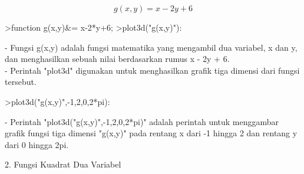 \documentclass[a4paper,10pt]{article}
\begin{document}
\begin{eulernotebook}
\begin{eulercomment}
\begin{eulercomment}
\begin{eulercomment}
\begin{eulercomment}
\begin{eulercomment}
\begin{eulercomment}
\begin{eulercomment}
\begin{eulercomment}
\begin{eulercomment}
\end{eulercomment}
\begin{eulerformula}
\[
g(x,y)=x-2y+6
\]
\end{eulerformula}
\begin{eulercomment}
\end{eulercomment}
\begin{eulerprompt}
>function g(x,y)&= x-2*y+6;
>plot3d("g(x,y)"):
\end{eulerprompt}
\begin{eulercomment}
- Fungsi g(x,y) adalah fungsi matematika yang mengambil dua variabel,
x dan y, dan menghasilkan sebuah nilai berdasarkan rumus x - 2y + 6.\\
- Perintah "plot3d" digunakan untuk menghasilkan grafik tiga dimensi
dari fungsi tersebut.
\end{eulercomment}
\begin{eulerprompt}
>plot3d("g(x,y)",-1,2,0,2*pi):
\end{eulerprompt}
\begin{eulercomment}
- Perintah "plot3d("g(x,y)",-1,2,0,2*pi)" adalah perintah untuk
menggambar grafik fungsi tiga dimensi "g(x,y)" pada rentang x dari -1
hingga 2 dan rentang y dari 0 hingga 2pi.

\end{eulercomment}
\eulersubheading{}
\begin{eulercomment}
2. Fungsi Kuadrat Dua Variabel


\end{eulercomment}
\end{eulercomment}
\end{eulercomment}
\end{eulercomment}
\end{eulercomment}
\end{eulercomment}
\end{eulercomment}
\end{eulercomment}
\end{eulercomment}
\end{eulernotebook}
\end{document}
